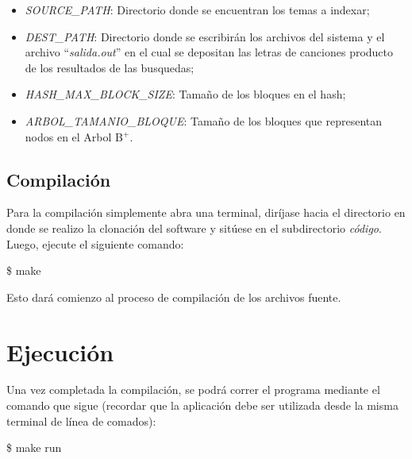 \documentclass{article}
\begin{document}
\begin{itemize}
\itemsep=5pt \topsep=0pt \partopsep=0pt \parskip=0pt \parsep=0pt

	\item \textit{SOURCE\_PATH}: Directorio donde se encuentran los temas a indexar;

	\item \textit{DEST\_PATH}: Directorio donde se escribirán los archivos del sistema y el archivo ``\textit{salida.out}'' en el cual se depositan las letras de canciones producto de los resultados de las busquedas;

	\item \textit{HASH\_MAX\_BLOCK\_SIZE}: Tamaño de los bloques en el hash;

	\item \textit{ARBOL\_TAMANIO\_BLOQUE}: Tamaño de los bloques que representan nodos en el Arbol B$^+$.

\end{itemize}
\bigskip



\subsection{Compilación}

	Para la compilación simplemente abra una terminal, diríjase hacia el directorio en donde se realizo la clonación del software y sitúese en el subdirectorio \textit{código}. Luego, ejecute el siguiente comando:
	\bigskip

	\colorbox{gray95}{{\ttfamily\footnotesize
	\$ make\\}}
	\bigskip

	Esto dará comienzo al proceso de compilación de los archivos fuente.
\bigskip\medskip




\section{Ejecución}

	Una vez completada la compilación, se podrá correr el programa mediante el comando que sigue (recordar que la aplicación debe ser utilizada desde la misma terminal de línea de comados):
	\bigskip

	\colorbox{gray95}{{\ttfamily\footnotesize
	\$ make run\\}}
	\medskip
\end{document}
